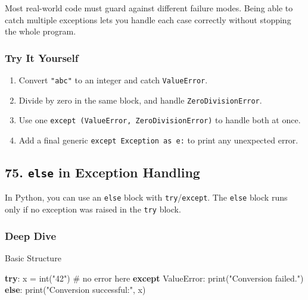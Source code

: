 \documentclass[
  letterpaper,
  DIV=11,
  numbers=noendperiod]{scrreprt}
\newenvironment{Shaded}{\begin{snugshade}}{\end{snugshade}}
\newcommand{\BuiltInTok}[1]{\textcolor[rgb]{0.00,0.23,0.31}{#1}}
\newcommand{\CommentTok}[1]{\textcolor[rgb]{0.37,0.37,0.37}{#1}}
\newcommand{\ControlFlowTok}[1]{\textcolor[rgb]{0.00,0.23,0.31}{\textbf{#1}}}
\newcommand{\NormalTok}[1]{\textcolor[rgb]{0.00,0.23,0.31}{#1}}
\newcommand{\OperatorTok}[1]{\textcolor[rgb]{0.37,0.37,0.37}{#1}}
\newcommand{\PreprocessorTok}[1]{\textcolor[rgb]{0.68,0.00,0.00}{#1}}
\newcommand{\StringTok}[1]{\textcolor[rgb]{0.13,0.47,0.30}{#1}}
\providecommand{\tightlist}{%
  \setlength{\itemsep}{0pt}\setlength{\parskip}{0pt}}
\begin{document}
Most real-world code must guard against different failure modes. Being
able to catch multiple exceptions lets you handle each case correctly
without stopping the whole program.

\subsubsection{Try It Yourself}\label{try-it-yourself-73}

\begin{enumerate}
\def\labelenumi{\arabic{enumi}.}
\tightlist
\item
  Convert \texttt{"abc"} to an integer and catch \texttt{ValueError}.
\item
  Divide by zero in the same block, and handle
  \texttt{ZeroDivisionError}.
\item
  Use one \texttt{except\ (ValueError,\ ZeroDivisionError)} to handle
  both at once.
\item
  Add a final generic \texttt{except\ Exception\ as\ e:} to print any
  unexpected error.
\end{enumerate}

\subsection{\texorpdfstring{75. \texttt{else} in Exception
Handling}{75. else in Exception Handling}}\label{else-in-exception-handling}

In Python, you can use an \texttt{else} block with
\texttt{try}/\texttt{except}. The \texttt{else} block runs only if no
exception was raised in the \texttt{try} block.

\subsubsection{Deep Dive}\label{deep-dive-74}

Basic Structure

\begin{Shaded}
\begin{Highlighting}[]
\ControlFlowTok{try}\NormalTok{:}
\NormalTok{    x }\OperatorTok{=} \BuiltInTok{int}\NormalTok{(}\StringTok{"42"}\NormalTok{)   }\CommentTok{\# no error here}
\ControlFlowTok{except} \PreprocessorTok{ValueError}\NormalTok{:}
    \BuiltInTok{print}\NormalTok{(}\StringTok{"Conversion failed."}\NormalTok{)}
\ControlFlowTok{else}\NormalTok{:}
    \BuiltInTok{print}\NormalTok{(}\StringTok{"Conversion successful:"}\NormalTok{, x)}
\end{Highlighting}
\end{Shaded}
\end{document}
